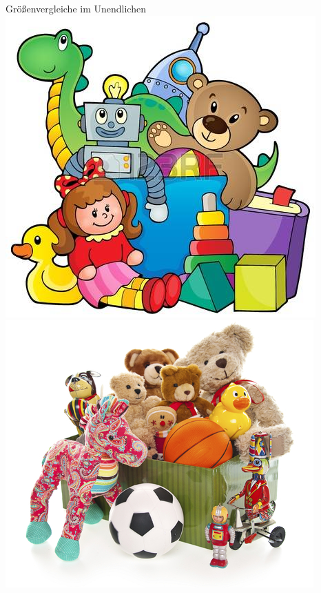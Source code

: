 \documentclass[12pt,compress,ngerman,utf8,t]{beamer}
\begin{document}
\begin{frame}{Größenvergleiche im Unendlichen}
  \centering
  \includegraphics[height=0.3\textheight]{spielzeughaufen-1}
  \qquad
  \includegraphics[height=0.3\textheight]{spielzeughaufen-2}
  \par
\end{frame}
\end{document}
